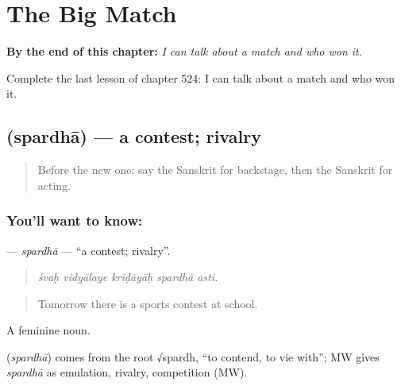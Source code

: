 
\chapter{The Big Match}
\label{ch:sa-the-big-match}

\begin{chapteropening}
\textbf{By the end of this chapter:} \emph{I can talk about a match and who won it.}

Complete the last lesson of chapter 524: I can talk about a match and who won it.
\end{chapteropening}

\section[\texorpdfstring{\sk{स्पर्धा} (spardhā)}{स्पर्धा (spardhā)}]{ (spardhā) — a contest; rivalry}

\label{lesson:SA-C524-spardha}



\begin{quote}
Before the new one: say the Sanskrit for backstage, then the Sanskrit for acting.
\end{quote}

\subsection*{You'll want to know: }
\textbf{} — \emph{spardhā} — \textquotedblleft{}a contest; rivalry\textquotedblright{}.

\begin{quote}
    
\end{quote}

\begin{quote}
\emph{śvaḥ vidyālaye krīḍāyāḥ spardhā asti.}
\end{quote}

\begin{quote}
Tomorrow there is a sports contest at school.
\end{quote}

A feminine noun.

\begin{cousinweb}
\textbf{} (\emph{spardhā}) comes from the root √spardh, \textquotedblleft{}to contend, to vie with\textquotedblright{}; MW gives \emph{spardhā} as emulation, rivalry, competition (MW).
\end{cousinweb}

